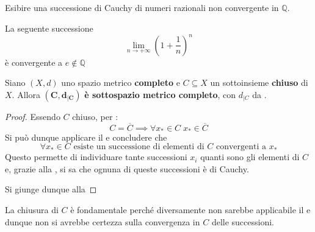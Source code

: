 \begin{exercise}
	Esibire una successione di Cauchy di numeri razionali non convergente in $\mathbb{Q}$.
	\begin{solution}
		La seguente successione
		$$\lim\limits_{n \to +\infty} \left( 1+ \frac{1}{n} \right)^n$$
		è convergente a $e \notin \mathbb{Q}$
	\end{solution}
\end{exercise}
\begin{proposition}
	\label{prop:subset_compl_e_compl}
	Siano $(X,d)$ uno spazio metrico \textbf{completo} e $C \subseteq X$ un sottoinsieme \textbf{chiuso} di $X$. Allora $\boldsymbol{(C,d_{|C})}$ \textbf{è sottospazio metrico completo}, con $d_{|C}$ da .
	\begin{proof}
		Essendo $C$ chiuso, per :
		$$C = \overline{C} \implies \forall x_* \in C\; x_* \in \overline{C}$$
		Si può dunque applicare il  e concludere che
		$$\forall x_* \in C \text{ esiste un successione di elementi di $C$ convergenti a $x_*$}$$
		Questo permette di individuare tante successioni $x_i$ quanti sono gli elementi di $C$ e, grazie alla , si sa che ognuna di queste successioni è di Cauchy.

		Si giunge dunque alla 
	\end{proof}
	\begin{note}
		La chiusura di $C$ è fondamentale perché diversamente non sarebbe applicabile il  e dunque non si avrebbe certezza sulla convergenza in $C$ delle successioni.
	\end{note}
\end{proposition}
